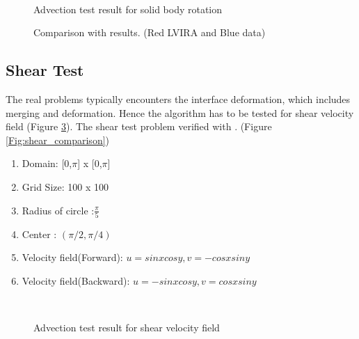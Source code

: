 % 
\begin{figure}
     \\
 \caption{Advection test result for solid body rotation}
 \label{Fig:rotation2}
\end{figure}
% 
\begin{figure}
 \centering 
 \caption{Comparison with \cite{Rudman1997} results. (Red LVIRA and Blue \cite{Rudman1997} data)}
 \label{Fig:rotation}
\end{figure}

\subsection{Shear Test}
The real problems typically encounters the interface deformation, which includes merging and deformation. Hence the algorithm has to be 
tested for shear velocity field (Figure \ref{Fig:shear}). The shear test problem verified with \cite{Gerlach2006}. (Figure \ref{Fig:shear_comparison}) 

   \begin{enumerate}
 \item Domain: [0,$\pi$] x [0,$\pi$]
 \item Grid Size: 100 x 100
 \item Radius of circle :$\frac{\pi}{5}$
 \item Center : $(\pi/2,\pi/4)$
 \item Velocity field(Forward):  $u=sin x cos y, v=-cos x sin y$
  \item Velocity field(Backward):  $u=-sin x cos y,v=cos x sin y$
 \end{enumerate}
 
\begin{figure}
\centering
 \\
 \caption{Advection test result for shear velocity field}
 \label{Fig:shear}
\end{figure}

